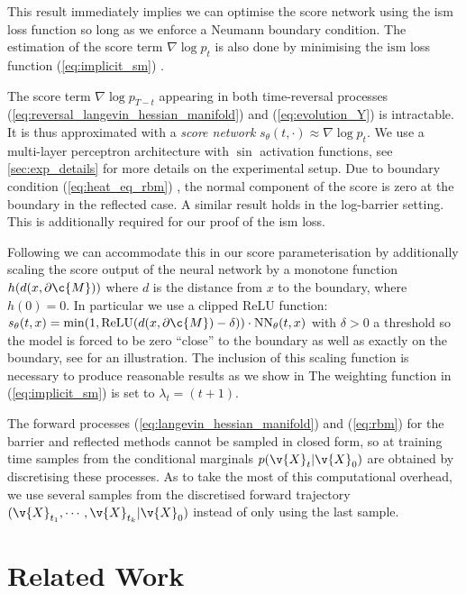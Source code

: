 This result immediately implies we can optimise the score network using the ism loss function so long as we enforce a Neumann boundary condition.
The estimation of the score term $\nabla \log p_t$ is also done by minimising the $\mathrm{ism}$ loss function (\ref{eq:implicit_sm}) .

The score term \(\nabla \log p_{T-t}\) appearing in both time-reversal processes (\ref{eq:reversal_langevin_hessian_manifold}) and (\ref{eq:evolution_Y}) is intractable.
It is thus approximated with a \emph{score network} $s_\theta(t, \cdot) \approx \nabla \log p_t$.
We use a multi-layer perceptron architecture with $\sin$ activation functions, see \cref{sec:exp_details} for more details on the experimental setup.
Due to boundary condition (\ref{eq:heat_eq_rbm}) , the normal component of the score is zero at the boundary in the reflected case.
A similar result holds in the log-barrier setting.
This is additionally required for our proof of the ism loss.

Following \cite{liu2022estimating} we can accommodate this in our score parameterisation by additionally scaling the score output of the neural network by a monotone function $h(d(x, \partial \c{M}))$ where $d$ is the distance from $x$ to the boundary, where $h(0) = 0$.
In particular we use a clipped ReLU function: $s_\theta(t, x) = \min(1, \textrm{ReLU}(d(x, \partial \c{M}) - \delta)) \cdot \textrm{NN}_\theta(t, x)$ with $\delta>0$ a threshold so the model is forced to be zero ``close'' to the boundary as well as exactly on the boundary, see  for an illustration.
The inclusion of this scaling function is necessary to produce reasonable results as we show in  The weighting function in (\ref{eq:implicit_sm}) is set to $\lambda_t = (t + 1)$.

The forward processes (\ref{eq:langevin_hessian_manifold}) and (\ref{eq:rbm}) for the barrier and reflected methods cannot be sampled in closed form, so at training time samples from the conditional marginals $p(\v{X}_t|\v{X}_0)$ are obtained by discretising these processes.
As to take the most of this computational overhead, we use several samples from the discretised forward trajectory $(\v{X}_{t_1}, \cdots, \v{X}_{t_k}|\v{X}_0)$ instead of only using the last sample.

\section{Related Work}
